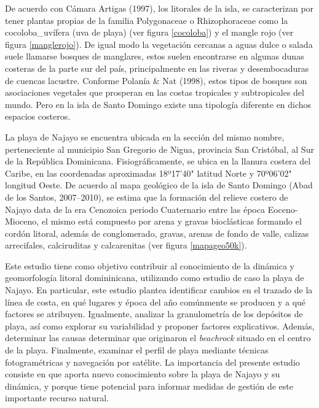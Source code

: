 \documentclass[11pt,]{article}
\begin{document}
De acuerdo con Cámara Artigas (1997), los litorales de la isla, se
caracterizan por tener plantas propias de la familia Polygonaceae o
Rhizophoraceae como la cocoloba\_uvífera (uva de playa) (ver figura
\ref{cocoloba}) y el mangle rojo (ver figura \ref{manglerojo}). De igual
modo la vegetación cercanas a aguas dulce o salada suele llamarse
bosques de manglares, estos suelen encontrarse en algunas dunas costeras
de la parte sur del país, principalmente en las riveras y desembocaduras
de cuencas lacustre. Conforme Polanía \& Nat (1998), estos tipos de
bosques son asociaciones vegetales que prosperan en las costas
tropicales y subtropicales del mundo. Pero en la isla de Santo Domingo
existe una tipología diferente en dichos espacios costeros.

La playa de Najayo se encuentra ubicada en la sección del mismo nombre,
perteneciente al municipio San Gregorio de Nigua, provincia San
Cristóbal, al Sur de la República Dominicana. Fisiográficamente, se
ubica en la llanura costera del Caribe, en las coordenadas aproximadas
18º17'40" latitud Norte y 70º06'02" longitud Oeste. De acuerdo al mapa
geológico de la isla de Santo Domingo (Abad de los Santos, 2007--2010),
se estima que la formación del relieve costero de Najayo data de la era
Cenozoica periodo Cuaternario entre las época Eoceno-Mioceno, el mismo
está compuesto por arena y gravas bioclásticas formando el cordón
litoral, además de conglomerado, gravas, arenas de fondo de valle,
calizas arrecifales, calciruditas y calcarenitas (ver figura
\ref{mapageo50k}).

Este estudio tiene como objetivo contribuir al conocimiento de la
dinámica y geomorfología litoral domininicana, utilizando como estudio
de caso la playa de Najayo. En particular, este estudio plantea
identificar cambios en el trazado de la línea de costa, en qué lugares y
época del año comúnmente se producen y a qué factores se atribuyen.
Igualmente, analizar la granulometría de los depósitos de playa, así
como explorar su variabilidad y proponer factores explicativos. Además,
determinar las causas determinar que originaron el \emph{beachrock}
situado en el centro de la playa. Finalmente, examinar el perfil de
playa mediante técnicas fotogramétricas y navegación por satélite. La
importancia del presente estudio consiste en que aporta nuevo
conocimiento sobre la playa de Najayo y su dinámica, y porque tiene
potencial para informar medidas de gestión de este importante recurso
natural.
\end{document}
